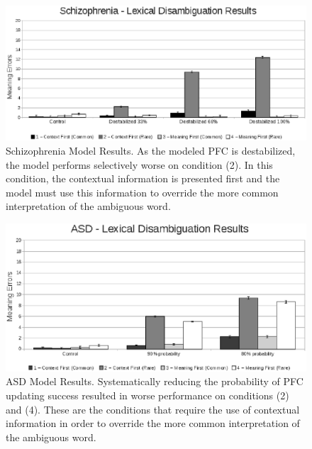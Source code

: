 \begin{figure}[tp]
\begin{center}
	\includegraphics[width=140mm]{graphs/schiz_lexamb_results.eps}
\end{center}
\caption{Schizophrenia Model Results. As the modeled PFC is destabilized, the model performs selectively worse on condition (2).  In this condition, the contextual information is presented first and the model must use this information to override the more common interpretation of the ambiguous word.} 
\label{Schiz-Amb-Results}
\end{figure} 

\begin{figure}[tp]
\begin{center}
	\includegraphics[width=140mm]{graphs/asd_lexamb_results.eps}
\end{center}
\caption{ASD Model Results. Systematically reducing the probability of PFC updating success resulted in worse performance on conditions (2) and (4). These are the conditions that require the use of contextual information in order to override the more common interpretation of the ambiguous word.} 
\label{ASD-Amb-Results}
\end{figure} 

